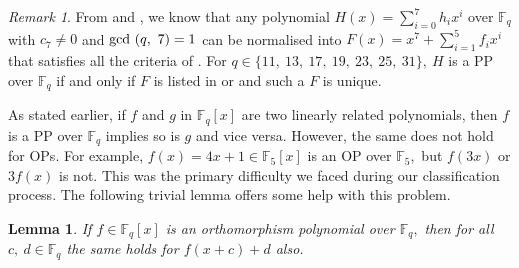 \documentclass[12pt,a4wide, reqno]{amsart}
\newtheorem{lemma}{Lemma}
\theoremstyle{definition}
\theoremstyle{remark}
\newtheorem{remark}{Remark}
\numberwithin{equation}{section}
\begin{document}
\begin{remark}\label{r2}
From  and , we know that any polynomial $H(x)=\sum_{i=0}^{7}h_ix^i$ over $\mathbb{F}_q$ with $c_7\neq 0$ and $\textup{gcd}~(q,~7)=1$ can be normalised into $F(x)=x^7+\sum_{i=1}^{5}f_ix^i$ that satisfies all the criteria of . For $q\in \{11,~13,~17,~19,~23,~25,~31\},~H$ is a PP over $\mathbb{F}_q$ if and only if $F$ is listed in  or  and such a $F$ is unique.
\end{remark}

As stated earlier, if $f$ and $g$ in $\mathbb{F}_q[x]$ are two linearly related polynomials, then $f$ is a PP over $\mathbb{F}_q$ implies so is $g$ and vice versa. However, the same does not hold for OPs. For example, $f(x)=4x+1\in \mathbb{F}_5[x]$ is an OP over $\mathbb{F}_5,$ but $f(3x)$ or $3f(x)$ is not. This was the primary difficulty we faced during our classification process. The following trivial lemma offers some help with this problem.
\begin{lemma} \cite{CPP1} \label{l5}
    If $f\in\mathbb{F}_q[x]$ is an orthomorphism polynomial over $\mathbb{F}_q,$ then for all $c,~d\in\mathbb{F}_q$ the same holds for $f(x+ c)+ d$ also.
\end{lemma}
\end{document}
